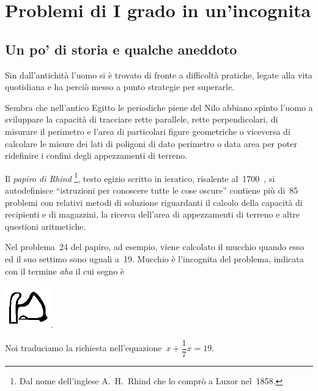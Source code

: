 
\chapter{Problemi di I grado in un'incognita}

\section{Un po' di storia e qualche aneddoto}
\label{sec:14_storia}

Sin dall'antichità l'uomo si è
trovato di fronte a difficoltà pratiche, legate alla vita quotidiana
e ha perciò messo a punto strategie per superarle.

Sembra che nell'antico Egitto le periodiche piene del
Nilo abbiano spinto l'uomo a sviluppare la capacità
di tracciare rette parallele, rette perpendicolari, di misurare il
perimetro e l'area di particolari figure geometriche o
viceversa di calcolare le misure dei lati di poligoni di dato perimetro
o data area per poter ridefinire i confini degli appezzamenti di
terreno.

Il \emph{papiro di Rhind}
\footnote{Dal nome dell'inglese A.~H.~Rhind che lo comprò a Luxor nel~1858.}, 
testo egizio scritto in
ieratico, risalente al~1700~\aC, si autodefinisce
``istruzioni per conoscere tutte le cose
oscure'' contiene più di~85 problemi con relativi
metodi di soluzione riguardanti il calcolo della capacità di
recipienti e di magazzini, la ricerca dell'area di
appezzamenti di terreno e altre questioni aritmetiche.

Nel problema~24 del papiro, ad esempio, viene calcolato il mucchio
quando esso ed il suo settimo sono uguali a~19. Mucchio è
l'incognita del problema, indicata con il termine
\emph{aha} il cui segno è
% 
\begin{inaccessibleblock}[Geroglifico]
 \includegraphics[scale=0.28]{img/giero.png}.
\end{inaccessibleblock}
                                                                  
Noi traduciamo la richiesta nell'equazione~$x+\dfrac{1}{7}x=19$.

